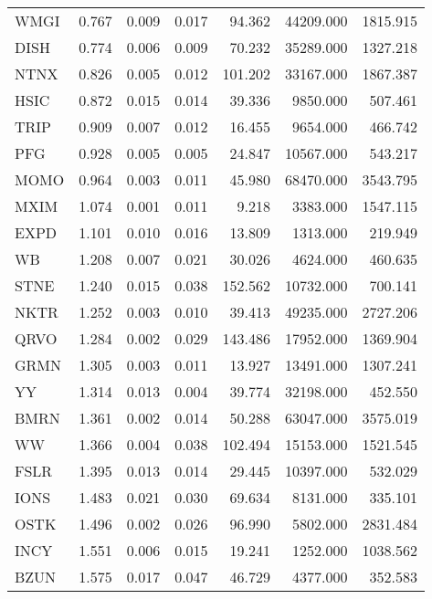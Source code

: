 \begin{table}
\begin{tabular}{lrrrrrr}
WMGI   &       0.767 &     0.009 &    0.017 &  94.362 &  44209.000 & 1815.915 \\
DISH   &       0.774 &     0.006 &    0.009 &  70.232 &  35289.000 & 1327.218 \\
NTNX   &       0.826 &     0.005 &    0.012 & 101.202 &  33167.000 & 1867.387 \\
HSIC   &       0.872 &     0.015 &    0.014 &  39.336 &   9850.000 &  507.461 \\
TRIP   &       0.909 &     0.007 &    0.012 &  16.455 &   9654.000 &  466.742 \\
PFG    &       0.928 &     0.005 &    0.005 &  24.847 &  10567.000 &  543.217 \\
MOMO   &       0.964 &     0.003 &    0.011 &  45.980 &  68470.000 & 3543.795 \\
MXIM   &       1.074 &     0.001 &    0.011 &   9.218 &   3383.000 & 1547.115 \\
EXPD   &       1.101 &     0.010 &    0.016 &  13.809 &   1313.000 &  219.949 \\
WB     &       1.208 &     0.007 &    0.021 &  30.026 &   4624.000 &  460.635 \\
STNE   &       1.240 &     0.015 &    0.038 & 152.562 &  10732.000 &  700.141 \\
NKTR   &       1.252 &     0.003 &    0.010 &  39.413 &  49235.000 & 2727.206 \\
QRVO   &       1.284 &     0.002 &    0.029 & 143.486 &  17952.000 & 1369.904 \\
GRMN   &       1.305 &     0.003 &    0.011 &  13.927 &  13491.000 & 1307.241 \\
YY     &       1.314 &     0.013 &    0.004 &  39.774 &  32198.000 &  452.550 \\
BMRN   &       1.361 &     0.002 &    0.014 &  50.288 &  63047.000 & 3575.019 \\
WW     &       1.366 &     0.004 &    0.038 & 102.494 &  15153.000 & 1521.545 \\
FSLR   &       1.395 &     0.013 &    0.014 &  29.445 &  10397.000 &  532.029 \\
IONS   &       1.483 &     0.021 &    0.030 &  69.634 &   8131.000 &  335.101 \\
OSTK   &       1.496 &     0.002 &    0.026 &  96.990 &   5802.000 & 2831.484 \\
INCY   &       1.551 &     0.006 &    0.015 &  19.241 &   1252.000 & 1038.562 \\
BZUN   &       1.575 &     0.017 &    0.047 &  46.729 &   4377.000 &  352.583 \\

\end{tabular}
\end{table}
